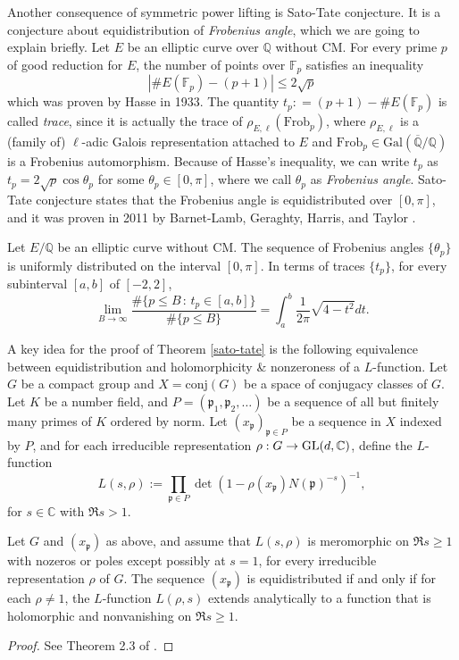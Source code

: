 Another consequence of symmetric power lifting is Sato-Tate conjecture.
It is a conjecture about equidistribution of \emph{Frobenius angle}, which we are going to explain briefly.
Let $E$ be an elliptic curve over $\mathbb{Q}$ without CM.
For every prime $p$ of good reduction for $E$, the number of points over $\mathbb{F}_{p}$ satisfies an inequality
$$
|\#E(\mathbb{F}_{p}) - (p + 1)| \leq 2\sqrt{p}
$$
which was proven by Hasse in 1933. The quantity $t_{p} : = (p + 1) - \#E(\mathbb{F}_{p})$ is called
\emph{trace}, since it is actually the trace of $\rho_{E, \ell}(\mathrm{Frob}_{p})$, where
$\rho_{E, \ell}$ is a (family of) $\ell$-adic Galois representation attached to $E$ and $\mathrm{Frob}_{p} \in \mathrm{Gal}(\overline{\mathbb{Q}} / \mathbb{Q})$
is a Frobenius automorphism.
Because of Hasse's inequality, we can write $t_{p}$ as $t_{p} = 2\sqrt{p}\cos\theta_{p}$ for some $\theta_{p} \in [0, \pi]$,
where we call $\theta_{p}$ as \emph{Frobenius angle}.
Sato-Tate conjecture states that the Frobenius angle is equidistributed over $[0, \pi]$,
and it was proven in 2011 by Barnet-Lamb, Geraghty, Harris, and Taylor \cite{barnet2011family}.

\begin{theorem}
\label{sato-tate}
Let $E/\mathbb{Q}$ be an elliptic curve without CM.
The sequence of Frobenius angles $\{\theta_{p}\}$ is uniformly distributed on the
interval $[0, \pi]$. In terms of traces $\{t_{p}\}$, for every subinterval $[a, b]$ of $[-2, 2]$,
$$
\lim_{B\to \infty} \frac{\#\{p\leq B\,:\, t_{p} \in [a, b]\}}{\#\{p\leq B\}} = \int_{a}^{b} \frac{1}{2\pi} \sqrt{4 - t^{2}} dt.
$$
\end{theorem}

A key idea for the proof of Theorem \ref{sato-tate} is the following equivalence between 
equidistribution and holomorphicity \& nonzeroness of a $L$-function.
Let $G$ be a compact group and $X = \mathrm{conj}(G)$ be a space of
conjugacy classes of $G$. Let $K$ be a number field, and $P = (\mathfrak{p}_{1}, \mathfrak{p}_{2}, \dots)$
be a sequence of all but finitely many primes of $K$ ordered by norm.
Let $(x_{\mathfrak{p}})_{\mathfrak{p}\in P}$ be a sequence in $X$ indexed by $P$, and for each
irreducible representation $\rho: G \to \operatorname{\mathrm{GL}}(d, \mathbb{C})$, define the $L$-function
$$
L(s, \rho) := \prod_{\mathfrak{p}\in P} \det(1 - \rho(x_{\mathfrak{p}})N(\mathfrak{p})^{-s})^{-1},
$$
for $s\in \mathbb{C}$ with $\Re s > 1$.

\begin{theorem}
\label{equidistribution}
Let $G$ and $(x_{\mathfrak{p}})$ as above, and assume that $L(s, \rho)$ is meromorphic on $\Re s \geq 1$
with nozeros or poles except possibly at $s=1$, for every irreducible representation $\rho$ of $G$.
The sequence $(x_{\mathfrak{p}})$ is equidistributed if and only if for each $\rho \neq 1$, the $L$-function
$L(\rho, s)$ extends analytically to a function that is holomorphic and nonvanishing on $\Re s \geq 1$.
\end{theorem}
\begin{proof}
See Theorem 2.3 of \cite{fite2015equidistribution}.
\end{proof}

